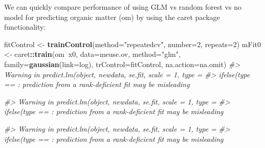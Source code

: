 \documentclass[11pt]{krantz}
\newenvironment{Shaded}{\begin{snugshade}}{\end{snugshade}}
\newcommand{\CommentTok}[1]{\textcolor[rgb]{0.37,0.37,0.37}{\textit{#1}}}
\newcommand{\DataTypeTok}[1]{\textcolor[rgb]{0.27,0.27,0.27}{#1}}
\newcommand{\DecValTok}[1]{\textcolor[rgb]{0.06,0.06,0.06}{#1}}
\newcommand{\KeywordTok}[1]{\textcolor[rgb]{0.27,0.27,0.27}{\textbf{#1}}}
\newcommand{\NormalTok}[1]{#1}
\newcommand{\OperatorTok}[1]{\textcolor[rgb]{0.43,0.43,0.43}{\textbf{#1}}}
\newcommand{\StringTok}[1]{\textcolor[rgb]{0.5,0.5,0.5}{#1}}
\theoremstyle{definition}
\theoremstyle{definition}
\theoremstyle{definition}
\theoremstyle{remark}
\begin{document}
We can quickly compare performance of using GLM vs random forest vs no
model for predicting organic matter (om) by using the caret package
functionality:

\begin{Shaded}
\begin{Highlighting}[]
\NormalTok{fitControl <-}\StringTok{ }\KeywordTok{trainControl}\NormalTok{(}\DataTypeTok{method=}\StringTok{"repeatedcv"}\NormalTok{, }\DataTypeTok{number=}\DecValTok{2}\NormalTok{, }\DataTypeTok{repeats=}\DecValTok{2}\NormalTok{)}
\NormalTok{mFit0 <-}\StringTok{ }\NormalTok{caret}\OperatorTok{::}\KeywordTok{train}\NormalTok{(om}\OperatorTok{~}\NormalTok{x0, }\DataTypeTok{data=}\NormalTok{meuse.ov, }\DataTypeTok{method=}\StringTok{"glm"}\NormalTok{, }
               \DataTypeTok{family=}\KeywordTok{gaussian}\NormalTok{(}\DataTypeTok{link=}\NormalTok{log), }\DataTypeTok{trControl=}\NormalTok{fitControl, }
               \DataTypeTok{na.action=}\NormalTok{na.omit)}
\CommentTok{#> Warning in predict.lm(object, newdata, se.fit, scale = 1, type =}
\CommentTok{#> ifelse(type == : prediction from a rank-deficient fit may be misleading}

\CommentTok{#> Warning in predict.lm(object, newdata, se.fit, scale = 1, type =}
\CommentTok{#> ifelse(type == : prediction from a rank-deficient fit may be misleading}

\CommentTok{#> Warning in predict.lm(object, newdata, se.fit, scale = 1, type =}
\CommentTok{#> ifelse(type == : prediction from a rank-deficient fit may be misleading}


\end{Highlighting}
\end{Shaded}
\end{document}

